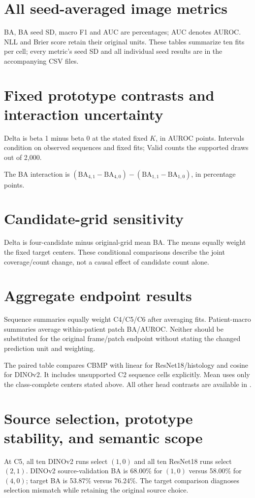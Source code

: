 \documentclass[10pt,letterpaper]{article}
\begin{document}
\section{All seed-averaged image metrics}
BA, BA seed SD, macro F1 and AUC are percentages; AUC denotes AUROC. NLL and Brier score retain their original units. These tables summarize ten fits per cell; every metric's seed SD and all individual seed results are in the accompanying CSV files.


\section{Fixed prototype contrasts and interaction uncertainty}
Delta is beta 1 minus beta 0 at the stated fixed $K$, in AUROC points. Intervals condition on observed sequences and fixed fits; Valid counts the supported draws out of 2,000.

The BA interaction is $(\mathrm{BA}_{4,1}-\mathrm{BA}_{4,0})-(\mathrm{BA}_{1,1}-\mathrm{BA}_{1,0})$, in percentage points.


\section{Candidate-grid sensitivity}
Delta is four-candidate minus original-grid mean BA. The means equally weight the fixed target centers. These conditional comparisons describe the joint coverage/count change, not a causal effect of candidate count alone.


\section{Aggregate endpoint results}
Sequence summaries equally weight C4/C5/C6 after averaging fits. Patient-macro summaries average within-patient patch BA/AUROC. Neither should be substituted for the original frame/patch endpoint without stating the changed prediction unit and weighting.

The paired table compares CBMP with linear for ResNet18/histology and cosine for DINOv2. It includes unsupported C2 sequence cells explicitly. Mean uses only the class-complete centers stated above. All other head contrasts are available in .


\section{Source selection, prototype stability, and semantic scope}
At C5, all ten DINOv2 runs select $(1,0)$ and all ten ResNet18 runs select $(2,1)$. DINOv2 source-validation BA is 68.00\% for $(1,0)$ versus 58.00\% for $(4,0)$; target BA is 53.87\% versus 76.24\%. The target comparison diagnoses selection mismatch while retaining the original source choice.
\end{document}
